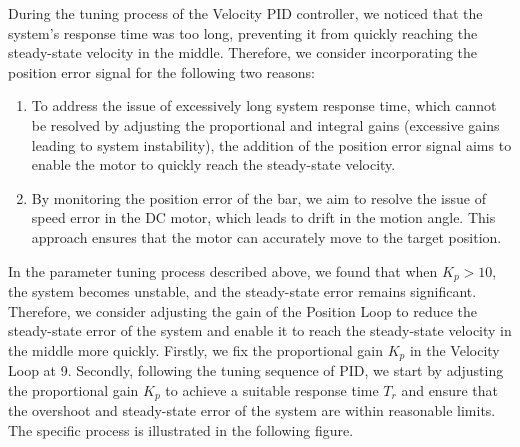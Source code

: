 \documentclass[11pt,a4paper]{article}%
\begin{document}
During the tuning process of the Velocity PID controller, we noticed that the system's response time was too long, preventing it from quickly reaching the steady-state velocity in the middle. Therefore, we consider incorporating the position error signal for the following two reasons:
\begin{enumerate}
    \item To address the issue of excessively long system response time, which cannot be resolved by adjusting the proportional and integral gains (excessive gains leading to system instability), the addition of the position error signal aims to enable the motor to quickly reach the steady-state velocity.
    \item By monitoring the position error of the bar, we aim to resolve the issue of speed error in the DC motor, which leads to drift in the motion angle. This approach ensures that the motor can accurately move to the target position.
\end{enumerate}
In the parameter tuning process described above, we found that when $K_p>10$, the system becomes unstable, and the steady-state error remains significant. Therefore, we consider adjusting the gain of the Position Loop to reduce the steady-state error of the system and enable it to reach the steady-state velocity in the middle more quickly. Firstly, we fix the proportional gain $K_p$ in the Velocity Loop at 9. Secondly, following the tuning sequence of PID, we start by adjusting the proportional gain $K_p$ to achieve a suitable response time $T_r$ and ensure that the overshoot and steady-state error of the system are within reasonable limits. The specific process is illustrated in the following figure.
\end{document}
